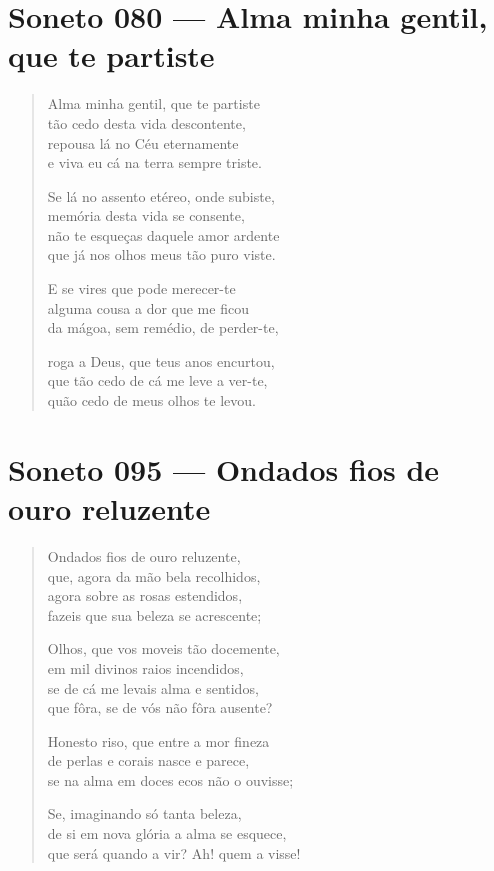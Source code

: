 \documentclass[10pt,a5paper,oneside]{book}
\begin{document}
\chapter{Soneto 080 --- Alma minha gentil, que te partiste}

\begin{verse}
Alma minha gentil, que te partiste\\
tão cedo desta vida descontente,\\
repousa lá no Céu eternamente\\
e viva eu cá na terra sempre triste.

Se lá no assento etéreo, onde subiste,\\
memória desta vida se consente,\\
não te esqueças daquele amor ardente\\
que já nos olhos meus tão puro viste.

E se vires que pode merecer-te\\
alguma cousa a dor que me ficou\\
da mágoa, sem remédio, de perder-te,

roga a Deus, que teus anos encurtou,\\
que tão cedo de cá me leve a ver-te,\\
quão cedo de meus olhos te levou.
\end{verse}

\chapter{Soneto 095 --- Ondados fios de ouro reluzente}

\begin{verse}
Ondados fios de ouro reluzente,\\
que, agora da mão bela recolhidos,\\
agora sobre as rosas estendidos,\\
fazeis que sua beleza se acrescente;

Olhos, que vos moveis tão docemente,\\
em mil divinos raios incendidos,\\
se de cá me levais alma e sentidos,\\
que fôra, se de vós não fôra ausente?

Honesto riso, que entre a mor fineza\\
de perlas e corais nasce e parece,\\
se na alma em doces ecos não o ouvisse;

Se, imaginando só tanta beleza,\\
de si em nova glória a alma se esquece,\\
que será quando a vir? Ah! quem a visse!
\end{verse}
\end{document}
